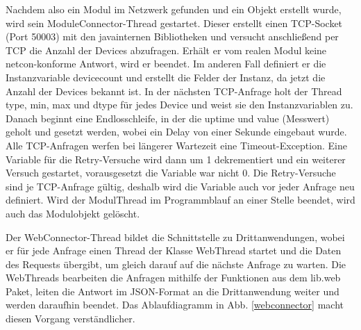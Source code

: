 \documentclass[a4paper,14pt,headsepline]{scrartcl}
\begin{document}
\newpage

Nachdem also ein Modul im Netzwerk gefunden und ein Objekt erstellt wurde, wird sein ModuleConnector-Thread gestartet. Dieser erstellt einen TCP-Socket (Port 50003) mit den javainternen Bibliotheken und versucht anschließend per TCP die Anzahl der Devices abzufragen. Erhält er vom realen Modul keine netcon-konforme Antwort, wird er beendet. Im anderen Fall definiert er die Instanzvariable devicecount und erstellt die Felder der Instanz, da jetzt die Anzahl der Devices bekannt ist. In der nächsten TCP-Anfrage holt der Thread type, min, max und dtype für jedes Device und weist sie den Instanzvariablen zu. Danach beginnt eine Endlosschleife, in der die uptime und value (Messwert) geholt und gesetzt werden, wobei ein Delay von einer Sekunde eingebaut wurde. Alle TCP-Anfragen werfen bei längerer Wartezeit eine Timeout-Exception. Eine Variable für die Retry-Versuche wird dann um 1 dekrementiert und ein weiterer Versuch gestartet, vorausgesetzt die Variable war nicht 0. Die Retry-Versuche sind je TCP-Anfrage gültig, deshalb wird die Variable auch vor jeder Anfrage neu definiert. Wird der ModulThread im Programmblauf an einer Stelle beendet, wird auch das Modulobjekt gelöscht.

Der WebConnector-Thread bildet die Schnittstelle zu Drittanwendungen, wobei er für jede Anfrage einen Thread der Klasse WebThread startet und die Daten des Requests übergibt, um gleich darauf auf die nächste Anfrage zu warten. Die WebThreads bearbeiten die Anfragen mithilfe der Funktionen aus dem lib.web Paket, leiten die Antwort im JSON-Format an die Drittanwendung weiter und werden daraufhin beendet. Das Ablaufdiagramm in Abb. \ref{webconnector} macht diesen Vorgang verständlicher. 

\newpage
\end{document}
